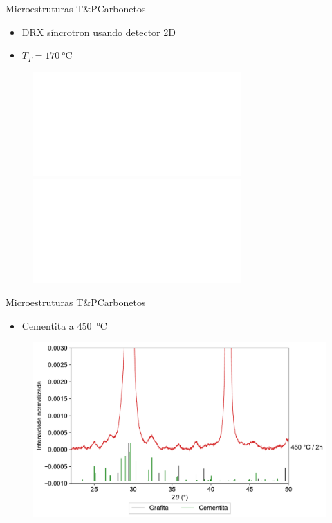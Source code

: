
\begin{frame}{Microestruturas T\&P}{Carbonetos}
  \begin{itemize}
    \item DRX síncrotron usando detector 2D
    \item $T_T = \SI{170}{\degreeCelsius}$
  \end{itemize}

  \begin{figure}
    \includegraphics<1>[width=\textwidth]{img/selected_diffractograms.pdf}
    \includegraphics<2>[width=\textwidth]{img/selected_diffractograms_detail.pdf}
  \end{figure}  
\end{frame}

\begin{frame}{Microestruturas T\&P}{Carbonetos}
  \begin{itemize}
    \item Cementita a \SI{450}{\degreeCelsius}
  \end{itemize}  

  \begin{figure}
    \includegraphics[width=\textwidth]{img/selected_diffractograms_cementite.pdf}
  \end{figure}
\end{frame}

